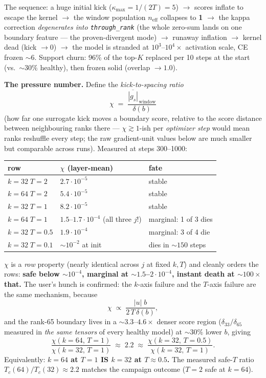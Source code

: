 \documentclass[11pt,a4paper]{article}
\newcommand{\code}[1]{\texttt{#1}}
\newcommand{\neff}{n_{\mathrm{eff}}}
\begin{document}
The sequence: a huge initial kick ($\kappa_{\max} = 1/(2T) = 5$) $\to$ scores
inflate to escape the kernel $\to$ the window population $\neff$ collapses to
\textbf{1} $\to$ the kappa correction \emph{degenerates into
\code{through\_rank}} (the whole zero-sum lands on one boundary feature ---
the proven-divergent mode) $\to$ runaway inflation $\to$ kernel dead (kick
$\to 0$) $\to$ the model is stranded at $10^3$--$10^4\times$ activation scale,
CE frozen ${\sim}6$. Support churn: 96\% of the top-$K$ replaced per 10 steps
at the start (vs.\ ${\sim}30\%$ healthy), then frozen solid (overlap
$\to 1.0$).

\textbf{The pressure number.} Define the \emph{kick-to-spacing ratio}
\[
  \chi \;=\; \frac{\overline{|g_s|}_{\,\text{window}}}{\delta(b)}
\]
(how far one surrogate kick moves a boundary score, relative to the score
distance between neighbouring ranks there --- $\chi \gtrsim 1$-ish per
\emph{optimizer step} would mean ranks reshuffle every step; the raw
gradient-unit values below are much smaller but comparable across runs).
Measured at steps 300--1000:

\begin{center}\small
\begin{tabular}{lll}
\toprule
row & $\chi$ (layer-mean) & fate \\
\midrule
$k{=}32\;T{=}2$ & $2.7\cdot10^{-5}$ & stable \\
$k{=}64\;T{=}2$ & $5.4\cdot10^{-5}$ & stable \\
$k{=}32\;T{=}1$ & $8.2\cdot10^{-5}$ & stable \\
$k{=}64\;T{=}1$ & $1.5$--$1.7\cdot10^{-4}$ (all three $j$!) & marginal: 1 of 3 dies \\
$k{=}32\;T{=}0.5$ & $1.9\cdot10^{-4}$ & marginal: 3 of 4 die \\
$k{=}32\;T{=}0.1$ & ${\sim}10^{-2}$ at init & dies in ${\sim}150$ steps \\
\bottomrule
\end{tabular}
\end{center}

$\chi$ is a \emph{row} property (nearly identical across $j$ at fixed $k,T$)
and cleanly orders the rows: \textbf{safe below ${\sim}10^{-4}$, marginal at
${\sim}1.5$--$2\cdot10^{-4}$, instant death at ${\sim}100\times$ that.} The
user's hunch is confirmed: the $k$-axis failure and the $T$-axis failure are
the same mechanism, because
\[
  \chi \;\propto\; \frac{|u|\; b}{2\,T\,\delta(b)},
\]
and the rank-65 boundary lives in a ${\sim}3.3$--$4.6\times$ denser score
region ($\delta_{33}/\delta_{65}$ measured in \emph{the same tensors} of every
healthy model) at ${\sim}30\%$ lower $b$, giving
\[
  \frac{\chi(k{=}64,\,T{=}1)}{\chi(k{=}32,\,T{=}1)} \;\approx\; 2.2
  \;\approx\; \frac{\chi(k{=}32,\,T{=}0.5)}{\chi(k{=}32,\,T{=}1)}.
\]
Equivalently: \textbf{$k{=}64$ at $T{=}1$ IS $k{=}32$ at $T{\approx}0.5$.} The
measured safe-$T$ ratio $T_c(64)/T_c(32) \approx 2.2$ matches the campaign
outcome ($T{=}2$ safe at $k{=}64$).
\end{document}

